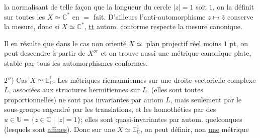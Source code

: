 la normalisant de telle façon que la longueur du cercle $|z|=1$ soit \deleted{$2\pi$} $1$, on la définit sur toutes les $X\simeq\mathbb C^*$ en $=$ fait. D'ailleurs l'anti-automorphisme $z\longmapsto\bar z$  conserve la mesure, donc si $X\simeq\mathbb C^*$, \uline{tt} autom. conforme respecte la mesure canonique.


Il en résulte que dans le cas non orienté $X\simeq$ plan projectif réel moins $1$ pt, on peut descendre à partir de $X^{or}$ et on trouve aussi une métrique canonique plate, stable par tous les automorphismes conformes.

$2''$) Cas $X\simeq\mathbb E^1_{\mathbb C}$. Les métriques riemanniennes sur une  droite vectorielle complexe $L$, associées aux structures hermitiennes sur $L$, (elles sont toutes proportionnelles) ne sont pas invariantes par autom  $L$, mais seulement par le sous-groupe engendré par les translations, et les  homothéties par des $u\in\mathbb U=\{z\in\mathbb C\mid |z|=1\}$; elles sont quasi-invariantes par autom. quelconques (lesquels sont \uline{affines}). Donc sur une $X\simeq\mathbb E^1_{\mathbb C}$, on peut définir, non \uline{une} métrique

